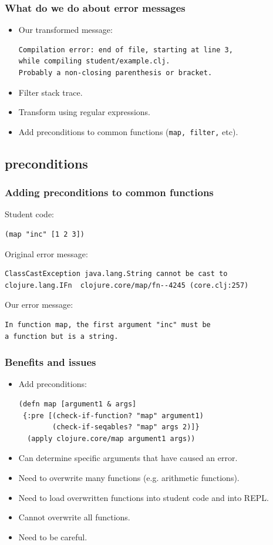 \documentclass{beamer}
\begin{document}
\begin{frame}[fragile]
   \frametitle { What do we do about error messages}
\begin{itemize}
\item Our transformed message:
\begin{verbatim}
Compilation error: end of file, starting at line 3,
while compiling student/example.clj.
Probably a non-closing parenthesis or bracket.
\end{verbatim}
\item Filter stack trace. 
\item Transform using regular expressions. 
\item Add preconditions to common functions ({\tt map, filter,} etc). 
\end{itemize}
\end{frame}

\subsection{preconditions}
\begin{frame}[fragile]
   \frametitle {Adding preconditions to common functions }
Student code:
\begin{verbatim}
(map "inc" [1 2 3])
\end{verbatim} 

Original error message:
\begin{verbatim}
ClassCastException java.lang.String cannot be cast to
clojure.lang.IFn  clojure.core/map/fn--4245 (core.clj:257)
\end{verbatim} 

Our error message: 
\begin{verbatim}
In function map, the first argument "inc" must be
a function but is a string.
\end{verbatim}
\end{frame}

\begin{frame}[fragile]
 \frametitle {Benefits and issues}
\begin{itemize}
\item Add preconditions:
\begin{verbatim}
(defn map [argument1 & args]
 {:pre [(check-if-function? "map" argument1)
        (check-if-seqables? "map" args 2)]}
  (apply clojure.core/map argument1 args))
\end{verbatim}
\item Can determine specific arguments that have caused an error. 
\item Need to overwrite many functions (e.g. arithmetic functions).
\item Need to load overwritten functions into student code and into REPL.
\item Cannot overwrite all functions. 
\item Need to be careful. 
\end{itemize}
\end{frame}
\end{document}
